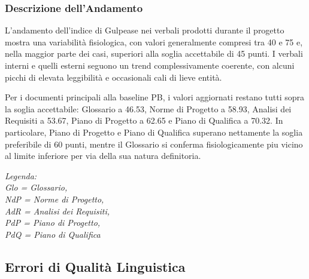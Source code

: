 \documentclass[a4paper,11pt,oneside]{scrartcl}
\begin{document}
\subsubsection*{Descrizione dell'Andamento}

L'andamento dell'indice di Gulpease nei verbali prodotti durante il progetto mostra una variabilità fisiologica, con valori generalmente compresi tra 40 e 75 e, nella maggior parte dei casi, superiori alla soglia accettabile di 45 punti. I verbali interni e quelli esterni seguono un trend complessivamente coerente, con alcuni picchi di elevata leggibilità e occasionali cali di lieve entità.

Per i documenti principali alla baseline PB, i valori aggiornati restano tutti sopra la soglia accettabile: Glossario a 46.53, Norme di Progetto a 58.93, Analisi dei Requisiti a 53.67, Piano di Progetto a 62.65 e Piano di Qualifica a 70.32. In particolare, Piano di Progetto e Piano di Qualifica superano nettamente la soglia preferibile di 60 punti, mentre il Glossario si conferma fisiologicamente piu vicino al limite inferiore per via della sua natura definitoria.

\noindent\textit{\small Legenda: \\Glo = Glossario, \\NdP = Norme di Progetto, \\AdR = Analisi dei Requisiti, \\PdP = Piano di Progetto, \\PdQ = Piano di Qualifica}

\subsection{Errori di Qualità Linguistica}
\end{document}
